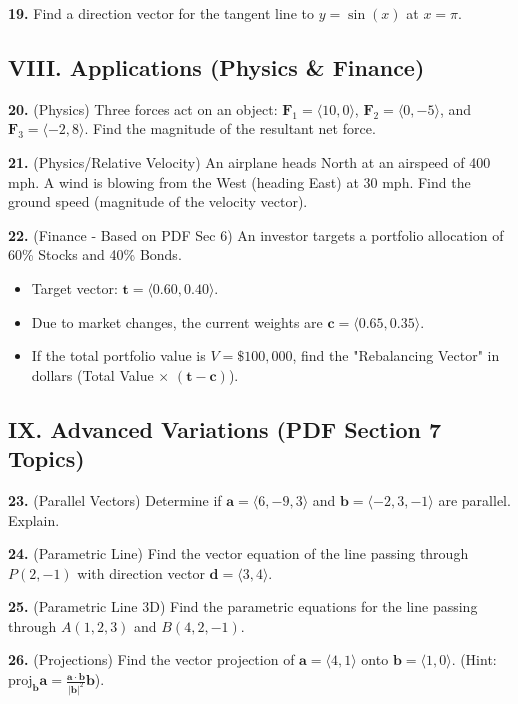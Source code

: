 \documentclass[12pt]{article}
\begin{document}
\textbf{19.} Find a direction vector for the tangent line to $y = \sin(x)$ at $x = \pi$.

\subsection*{VIII. Applications (Physics \& Finance)}
\textbf{20.} (Physics) Three forces act on an object: $\mathbf{F}_1 = \langle 10, 0 \rangle$, $\mathbf{F}_2 = \langle 0, -5 \rangle$, and $\mathbf{F}_3 = \langle -2, 8 \rangle$. Find the magnitude of the resultant net force.

\textbf{21.} (Physics/Relative Velocity) An airplane heads North at an airspeed of 400 mph. A wind is blowing from the West (heading East) at 30 mph. Find the ground speed (magnitude of the velocity vector).

\textbf{22.} (Finance - Based on PDF Sec 6) An investor targets a portfolio allocation of 60\% Stocks and 40\% Bonds.
\begin{itemize}
    \item Target vector: $\mathbf{t} = \langle 0.60, 0.40 \rangle$.
    \item Due to market changes, the current weights are $\mathbf{c} = \langle 0.65, 0.35 \rangle$.
    \item If the total portfolio value is $V = \$100,000$, find the "Rebalancing Vector" in dollars (Total Value $\times$ $(\mathbf{t} - \mathbf{c})$).
\end{itemize}

\subsection*{IX. Advanced Variations (PDF Section 7 Topics)}
\textbf{23.} (Parallel Vectors) Determine if $\mathbf{a} = \langle 6, -9, 3 \rangle$ and $\mathbf{b} = \langle -2, 3, -1 \rangle$ are parallel. Explain.

\textbf{24.} (Parametric Line) Find the vector equation of the line passing through $P(2, -1)$ with direction vector $\mathbf{d} = \langle 3, 4 \rangle$.

\textbf{25.} (Parametric Line 3D) Find the parametric equations for the line passing through $A(1, 2, 3)$ and $B(4, 2, -1)$.

\textbf{26.} (Projections) Find the vector projection of $\mathbf{a} = \langle 4, 1 \rangle$ onto $\mathbf{b} = \langle 1, 0 \rangle$. (Hint: $\text{proj}_{\mathbf{b}}\mathbf{a} = \frac{\mathbf{a}\cdot\mathbf{b}}{|\mathbf{b}|^2}\mathbf{b}$).
\end{document}
